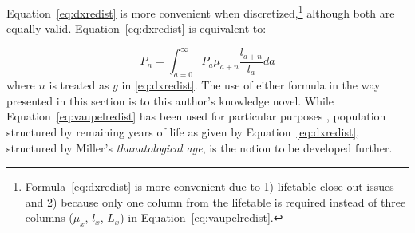 Equation~\eqref{eq:dxredist} is more convenient when 
discretized,\footnote{Formula~\eqref{eq:dxredist} is more convenient due to 1)
lifetable close-out issues and 2) because only one column from the lifetable is required instead 
of three columns ($\mu_x$, $l_x$, $L_x$) in
Equation~\eqref{eq:vaupelredist}. } although both are equally valid.
Equation~\ref{eq:dxredist} is equivalent to:

\begin{equation}
P_n = \int _{a=0} ^\infty P_a \mu_{a+n} \frac{l_{a+n}}{l_a} da
\end{equation}
where $n$ is treated as $y$ in \ref{eq:dxredist}.
The use of either formula in the way presented in this section is to this
author's knowledge novel. While Equation~\eqref{eq:vaupelredist} has
been used for particular purposes \citep{miller2001increasing}, population
structured by remaining years of life as given by Equation~\eqref{eq:dxredist},
structured by Miller's \textit{thanatological age}, is the notion
to be developed further.

